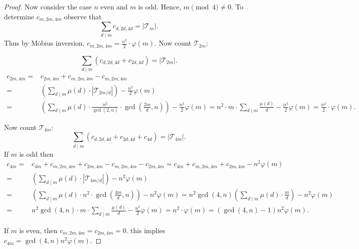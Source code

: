 \documentclass[12pt]{article}
\theoremstyle{definition}
\theoremstyle{remark}
\begin{document}
\begin{proof}
Now consider the case $n$ even and $m$ is odd. Hence, $m \pmod 4 \neq 0.$
To determine
${c}_{m,2m,4m}$ observe
that   \[\sum_{d\mid m} c_{d,2d,4d}= |\mathcal{T}_m\vert .\]
Thus  by M\"obius inversion, $c_{m,2m,4m}=\frac{n^2}{2}\cdot \varphi(m).$
Now count $\mathcal{T}_{2m}$:

\[\sum_{d\mid m }( c_{d,2d,4d}+c_{2d,4d})= |\mathcal{T}_{2m}|.\]
\begin{align}
c_{2m,4m}=&c_{2m,4m} + c_{m,2m,4m}-c_{m,2m,4m}\\ =& (\sum_{d\mid m} \mu(d) \cdot |\mathcal{T}_{2m/d}|)-\frac{n^2}{2}\varphi(m)\\
=&
(\sum_{d\mid m} \mu(d) \cdot \frac{n^2}{\gcd(2,n)}\cdot \gcd\left( \frac{2m}{d},n\right))-\frac{n^2}{2}\varphi(m)
= n^2\cdot m\cdot  \sum_{d\mid m}  \frac{\mu(d)}{d} -\frac{n^2}{2}\varphi(m)=\frac{n^2}{2}\cdot \varphi(m).
\end{align}


Now count $\mathcal{T}_{4m}$:
\[\sum_{d\mid m }( c_{d,2d,4d}+c_{2d,4d}+c_{4d})= |\mathcal{T}_{4m}|.\]
If $m$ is odd then
\begin{align}
c_{4m}=&c_{4m} + c_{m,2m,4m}+c_{2m,4m}- c_{m,2m,4m}-c_{2m,4m}=c_{4m} + c_{m,2m,4m}+c_{2m,4m}-n^2 \varphi(m)\\ =& (\sum_{d\mid m} \mu(d) \cdot |\mathcal{T}_{4m/d}|)-n^2\varphi(m)\\
=&
(\sum_{d\mid m} \mu(d) \cdot n^2\cdot \gcd\left( \frac{4m}{d},n\right))-n^2\varphi(m)=n^2\gcd(4,n) (\sum_{d\mid m} \mu(d)  \cdot \frac{m}{d})-n^2\varphi(m)\\
=& n^2\gcd(4,n)\cdot m\cdot  \sum_{d\mid m}  \frac{\mu(d)}{d} -\frac{n^2}{2}\varphi(m)=n^2\cdot \varphi(m) = (\gcd(4,n)-1)n^2 \varphi(m).
\end{align}

If $m$ is even, then $c_{m,2m,4m}=c_{2m,4m}=0.$ this implies $c_{4m}=\gcd(4,n)n^2\varphi(m).$

\end{proof}
\end{document}
